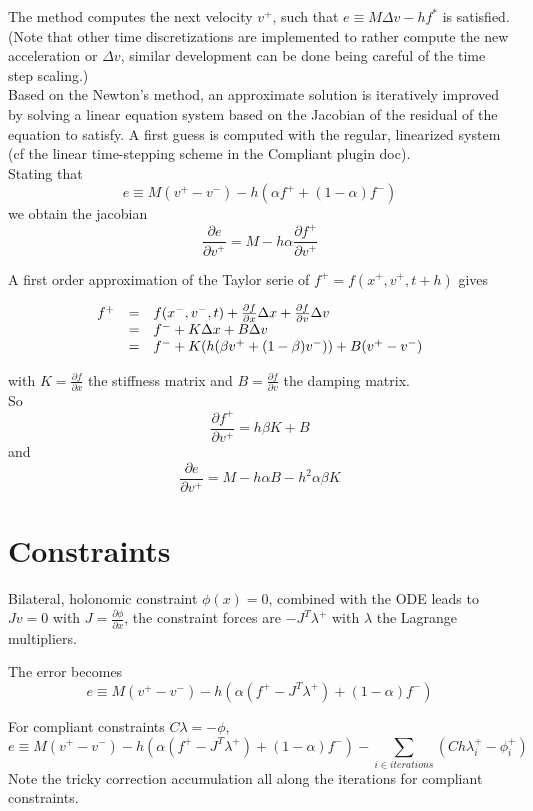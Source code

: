 \documentclass{article}
\newcommand{\ddd}[2]{\frac{\partial #1}{\partial #2}}
\newcommand{\p}[1]{#1^{+}}
\newcommand{\m}[1]{#1^{-}}
\newcommand{\s}[1]{#1^{*}}
\newcommand{\xp}{\p{x}}
\newcommand{\xm}{\m{x}}
\newcommand{\vp}{\p{v}}
\newcommand{\vm}{\m{v}}
\newcommand{\fp}{\p{f}}
\newcommand{\fm}{\m{f}}
\newcommand{\fs}{\s{f}}
\newcommand{\Dx}{\Delta x}
\newcommand{\Dv}{\Delta v}
\newcommand{\lambdap}{\p{\lambda}}
\newcommand{\phip}{\p{\phi}}
\begin{document}
The method computes the next velocity $\vp$, such that $e \equiv M\Dv-h\fs$ is satisfied.
(Note that other time discretizations are implemented to rather compute the new acceleration or $\Dv$, similar development can be done being careful of the time step scaling.)\\


Based on the Newton's method, an approximate solution is iteratively improved by solving a linear equation system based on the Jacobian of the residual of the equation to satisfy.
A first guess is computed with the regular, linearized system (cf the linear time-stepping scheme in the Compliant plugin doc). \\


Stating that \[ e \equiv M(\vp-\vm)-h(\alpha\fp+(1-\alpha)\fm)\] we obtain the jacobian \[ \ddd{e}{\vp}=M-h\alpha\ddd{\fp}{\vp}\]

A first order approximation of the Taylor serie of $\fp=f(\xp,\vp,t+h)$ gives

\[
   \begin{array}{r c l}
      \fp  & = & f(\xm,\vm,t)+\ddd{f}{x}\Dx+\ddd{f}{v}\Dv \\
           & = & \fm+K\Dx+B\Dv \\
           & = & \fm+K(h(\beta\vp+(1-\beta)\vm))+B(\vp-\vm)
   \end{array}
\]

with $K=\ddd{f}{x}$ the stiffness matrix and $B=\ddd{f}{v}$ the damping matrix. \\


So \[ \ddd{\fp}{\vp}=h\beta K+B\] and \[\ddd{e}{\vp}=M-h\alpha B-h^2\alpha\beta K\]


\section{Constraints}


Bilateral, holonomic constraint $\phi(x)=0$, combined with the ODE leads to $Jv=0$ with $J=\ddd{\phi}{x}$, the constraint forces are $-J^T\lambdap$ with $\lambda$ the Lagrange multipliers.

The error becomes \[ e \equiv M(\vp-\vm)-h(\alpha(\fp-J^T\lambdap)+(1-\alpha)\fm)\]

For compliant constraints $C\lambda=-\phi$, \[ e \equiv M(\vp-\vm)-h(\alpha(\fp-J^T\lambdap)+(1-\alpha)\fm)-\sum_{i\in iterations}(Ch\lambdap_i-\phip_i)\]
Note the tricky correction accumulation all along the iterations for compliant constraints.
\\
\end{document}
